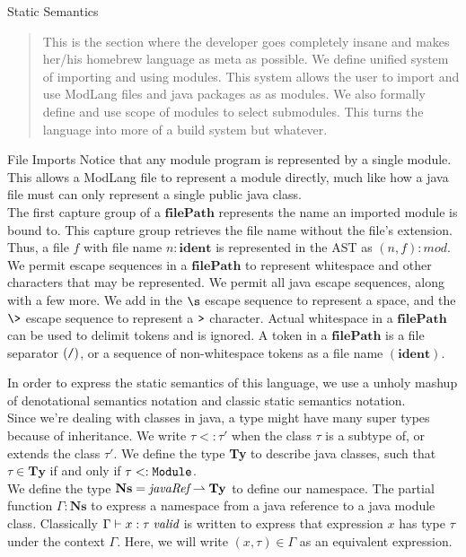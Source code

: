 \documentclass[11pt]{article}
\newcommand\IDENT{\textbf{ident}}
\newcommand\FILEPATH{\textbf{filePath}}
\begin{document}
\begin{section}{Static Semantics}
\begin{quote}
This is the section where the developer goes completely insane and makes her/his homebrew language as meta as possible. We define unified system of importing and using modules. This system allows the user to import and use ModLang files and java packages as as modules. We also formally define and use scope of modules to select submodules. This turns the language into more of a build system but whatever.
\end{quote}
\begin{subsection}{File Imports}
Notice that any module program is represented by a single module. This allows a ModLang file to represent a module directly, much like how a java file must can only represent a single public java class. \\

The first capture group of a $\FILEPATH$ represents the name an imported module is bound to. This capture group retrieves the file name without the file's extension. Thus, a file $f$ with file name $n : \IDENT$ is represented in the AST as $(n, f) : mod$.\\

We permit escape sequences in a $\FILEPATH$ to represent whitespace and other characters that may be represented. We permit all java escape sequences, along with a few more. We add in the $\verb|\s|$ escape sequence to represent a space, and the $\verb|\>|$ escape sequence to represent a $\verb|>|$ character. Actual whitespace in a $\FILEPATH$ can be used to delimit tokens and is ignored. A token in a $\FILEPATH$ is a file separator $(\verb|/|)$, or a sequence of non-whitespace tokens as a file name $(\IDENT)$.\\
\end{subsection}

In order to express the static semantics of this language, we use a unholy mashup of denotational semantics notation and classic static semantics notation.\\ 

Since we're dealing with classes in java, a type might have many super types because of inheritance. We write $\tau <: \tau'$ when the class $\tau$ is a subtype of, or extends the class $\tau'$. We define the type \textbf{Ty} to describe java classes, such that $\tau \in \textbf{Ty}$ if and only if $\tau <: \verb|Module|$.\\

We define the type $\textbf{Ns} = \emph{javaRef} \rightharpoonup \textbf{Ty}$ to define our namespace. The  partial function $\Gamma : \textbf{Ns}$ to express a namespace from a java reference to a java module class. Classically $\Gamma \vdash x : \tau\;\emph{valid}$ is written to express that expression $x$  has type $\tau$ under the context $\Gamma$. Here, we will write $(x, \tau) \in \Gamma$ as an equivalent expression.\\


\end{section}
\end{document}
